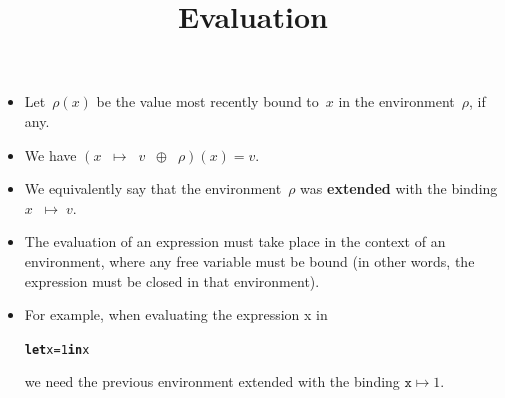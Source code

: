\documentclass[wide]{slides}
\begin{document}
\begin{slide}
  \title{Evaluation}

  \begin{itemize}

    \item Let~\(\rho(x)\) be the value most recently bound to~\(x\) in
      the environment~\(\rho\), if any.

    \item We have \((x \;\; \mapsto \;\; v \;\; \oplus \;\; \rho)(x) =
      v\).

    \item We equivalently say that the environment~\(\rho\) was
      \textbf{extended} with the binding \(x \;\; \mapsto \; v\).

    \item The evaluation of an expression must take place in the
      context of an environment, where any free variable must be bound
      (in other words, the expression must be closed in that
      environment).

    \item For example, when evaluating the expression x in
\begin{alltt}
\textbf{let} x = 1 \textbf{in} x
\end{alltt}
      we need the previous environment extended with the binding
      \(\texttt{x} \mapsto 1\).

  \end{itemize}

\end{slide}
\end{document}
